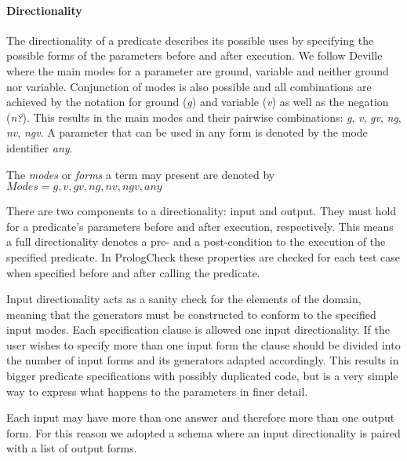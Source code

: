 \documentclass[runningheads,a4paper]{../../PaperStyles/llncs}
\newcommand{\plqc}[0]{{\sf PrologCheck}}
\begin{document}
\paragraph{\bf Directionality}

The directionality of a predicate describes its possible uses by
specifying the possible forms of the parameters before and after
execution.
%
We follow Deville~\cite{Deville1990logprog} where the main modes for a
parameter are ground, variable and neither ground
nor variable.
%
Conjunction of modes is also possible and all combinations are achieved
by the notation for ground (\emph{g}) and variable (\emph{v}) as well as
the negation (\emph{n?}).
%
This results in the main modes and their pairwise combinations: \emph{g},
\emph{v}, \emph{gv},  \emph{ng}, \emph{nv}, \emph{ngv}.
%
A parameter that can be used in any form is denoted by the mode
identifier \emph{any}.


\begin{definition}
\label{def:modes}
The \emph{modes} or \emph{forms} a term may present are denoted by\\
 $Modes = {g, v, gv, ng, nv, ngv, any}$
\end{definition}


There are two components to a directionality: input and output.
%
They must hold for a predicate's parameters before and after execution,
respectively.
%
This means a full directionality denotes a pre- and a post-condition to
the execution of the specified predicate.
%
In \plqc{} these properties are checked for each test case when
specified before and after calling the predicate.


Input directionality acts as a sanity check for the elements of the
domain, meaning that the generators must be constructed to conform to the
specified input modes.
%
Each specification clause is allowed one input directionality.
%
If the user wishes to specify more than one input form the clause should
be divided into the number of input forms and its generators adapted
accordingly.
%
This results in bigger predicate specifications with possibly
duplicated code, but is a very simple way to express what happens to the
parameters in finer detail.


Each input may have more than one answer and therefore more than one
output form.
%
For this reason we adopted a schema where an input directionality is
paired with a list of output forms.
\end{document}
